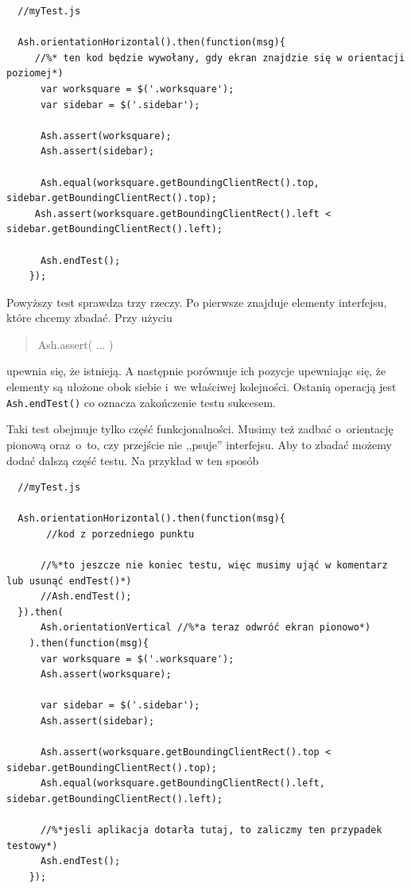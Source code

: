 \documentclass[brudnopis]{xmgr}
\begin{document}
\begin{enumerate}
 \begin{lstlisting}
  //myTest.js

  Ash.orientationHorizontal().then(function(msg){
     //%* ten kod będzie wywołany, gdy ekran znajdzie się w orientacji poziomej*)
      var worksquare = $('.worksquare');
      var sidebar = $('.sidebar');

      Ash.assert(worksquare);
      Ash.assert(sidebar);

      Ash.equal(worksquare.getBoundingClientRect().top, sidebar.getBoundingClientRect().top);
     Ash.assert(worksquare.getBoundingClientRect().left < sidebar.getBoundingClientRect().left);

      Ash.endTest();
    });  
\end{lstlisting}

Powyższy test sprawdza trzy rzeczy. Po pierwsze znajduje elementy interfejsu, które chcemy zbadać. Przy użyciu 

\begin{quote}
Ash.assert( ... ) 
\end{quote}

upewnia się, że istnieją. A następnie porównuje ich pozycje upewniając się, że elementy są ułożone obok siebie i~we właściwej kolejności. Ostanią operacją jest \texttt{Ash.endTest()} co oznacza zakończenie testu sukcesem.

Taki test obejmuje tylko część funkcjonalności. Musimy też zadbać o~orientację pionową oraz~o~to, czy przejście nie ,,psuje'' interfejsu. Aby to zbadać możemy dodać dalszą część testu. Na przykład w ten sposób

 \begin{lstlisting}
  //myTest.js

  Ash.orientationHorizontal().then(function(msg){
       //kod z porzedniego punktu

      //%*to jeszcze nie koniec testu, więc musimy ująć w komentarz lub usunąć endTest()*)
      //Ash.endTest();
  }).then(
      Ash.orientationVertical //%*a teraz odwróć ekran pionowo*)
    ).then(function(msg){
      var worksquare = $('.worksquare');
      Ash.assert(worksquare);
      
      var sidebar = $('.sidebar');
      Ash.assert(sidebar);

      Ash.assert(worksquare.getBoundingClientRect().top < sidebar.getBoundingClientRect().top);
      Ash.equal(worksquare.getBoundingClientRect().left, sidebar.getBoundingClientRect().left);        

      //%*jesli aplikacja dotarła tutaj, to zaliczmy ten przypadek testowy*)
      Ash.endTest();
    });
\end{lstlisting}


\end{enumerate}
\end{document}
